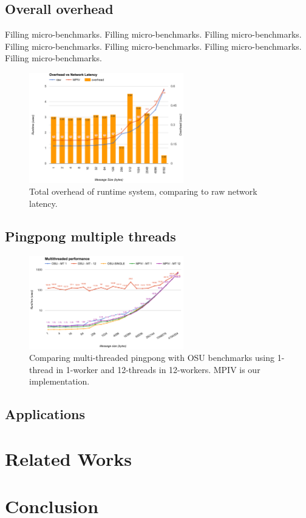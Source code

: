 \documentclass{sig-alternate-05-2015}
\begin{document}
\subsection{Overall overhead}
Filling micro-benchmarks.
Filling micro-benchmarks.
Filling micro-benchmarks.
Filling micro-benchmarks.
Filling micro-benchmarks.
Filling micro-benchmarks.
Filling micro-benchmarks.
\begin{figure}[h!]
  \centering 
  \includegraphics[width=0.6\textwidth]{fig/overhead.png}
  \caption{Total overhead of runtime system, comparing to raw network latency.}
\end{figure}

\subsection{Pingpong multiple threads}
\begin{figure}[h!]
  \centering 
  \includegraphics[width=0.6\textwidth]{fig/pingpong.png}
  \caption{Comparing multi-threaded pingpong with OSU benchmarks using 1-thread
  in 1-worker and 12-threads in 12-workers. MPIV is our implementation.}
\end{figure}

\subsection{Applications}
\section{Related Works}
\label{sec:related}
\section{Conclusion}
\label{sec:conclusion}



\end{document}
